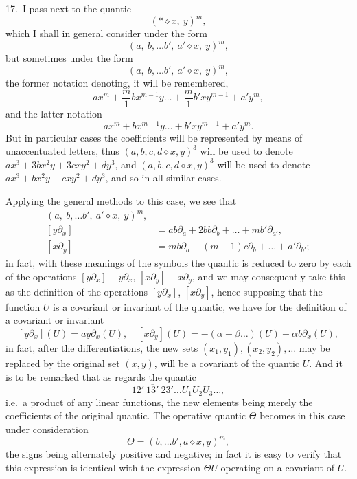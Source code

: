 \documentclass[11pt,a4paper]{article}
\begin{document}
\medskip

17.\ I pass next to the quantic
\[
(*\diamond x,\ y)^m,
\]
which I shall in general consider under the form
\[
(a,\ b,\ldots b',\ a' \diamond x,\ y)^m,
\]
but sometimes under the form
\[
(a,\ b,\ldots b',\ a' \diamond x,\ y)^m,
\]
the former notation denoting, it will be remembered,
\[
ax^m + \frac{m}{1}bx^{m-1}y \ldots + \frac{m}{1}b'xy^{m-1} + a'y^m,
\]
and the latter notation
\[
ax^m + bx^{m-1}y \ldots + b'xy^{m-1} + a'y^m.
\]
But in particular cases the coefficients will be represented by means of unaccentuated letters, thus $(a, b, c, d \diamond x, y)^3$ will be used to denote $ax^3 + 3bx^2y + 3cxy^2 + dy^3$, and $(a, b, c, d \diamond x, y)^3$ will be used to denote $ax^3 + bx^2y + cxy^2 + dy^3$, and so in all similar cases.

\medskip

Applying the general methods to this case, we see that
\begin{align*}
(a,\ b,\ldots b',\ a' \diamond x,\ y)^m,&\\
{}[y\partial_x] &= ab\partial_a + 2bb\partial_b + \ldots + mb'\partial_{a'},\\
{}[x\partial_y] &= mb\partial_a + (m - 1)c\partial_b + \ldots + a'\partial_{b'};
\end{align*}
in fact, with these meanings of the symbols the quantic is reduced to zero by each of the operations $[y\partial_x] - y\partial_x$, $[x\partial_y] - x\partial_y$, and we may consequently take this as the definition of the operations $[y\partial_x]$, $[x\partial_y]$, hence supposing that the function $U$ is a covariant or invariant of the quantic, we have for the definition of a covariant or invariant
\[
[y\partial_x](U) = ay\partial_x(U),\quad [x\partial_y](U) = -(\alpha + \beta\ldots)(U) + \alpha b\partial_x(U),
\]
in fact, after the differentiations, the new sets $(x_1, y_1), (x_2, y_2), \ldots$ may be replaced by the original set $(x, y)$, will be a covariant of the quantic $U$. And it is to be remarked that as regards the quantic
\[
\overline{12'\ 13'\ 23'}\ldots U_1 U_2 U_3 \ldots,
\]
i.e.\ a product of any linear functions, the new elements being merely the coefficients of the original quantic. The operative quantic $\Theta$ becomes in this case under consideration
\[
\Theta = (b, \ldots b', a \diamond x, y)^m,
\]
the signs being alternately positive and negative; in fact it is easy to verify that this expression is identical with the expression $\Theta U$ operating on a covariant of $U$.

\medskip
\end{document}
